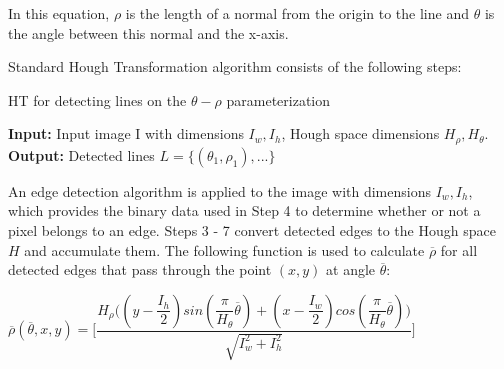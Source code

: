 In this equation, \textit{$ \rho $} is the length of a normal from the origin to the line and \textit{$ \theta $} is the angle between this normal and the x-axis.
 

 
Standard Hough Transformation algorithm consists of the following steps\cite{Standard_Hough}:
 
\begin{algorithm}[h]

 \caption{ HT for detecting lines on the $\theta - \rho$ parameterization}
\begin{algorithmic}[1]
        \newline
        \textbf{Input: }Input image I with dimensions $I_{w},I_{h}$, Hough space dimensions $H_{\rho},H_{\theta}$.\newline
        \textbf{Output:} Detected lines $L=\lbrace(\theta_{1},\rho_{1}),...\rbrace$ 
         \EndIf
         \EndFor
        
        \EndProcedure
 \end{algorithmic}    
 \end{algorithm}
 
 
An edge detection algorithm is applied to the image with dimensions $I_{w}, I_{h}$, which provides the binary data used in Step 4 to determine whether or not a pixel belongs to an edge. Steps 3 - 7 convert detected edges to the Hough space $H$ and accumulate them. The following function is used to calculate $\overline{\rho}$ for all detected edges that pass through the point $(x,y)$ at angle $\overline{\theta}$\cite{Standard_Hough}: 
 
 
 \begin{center}
 
 
$ \overline{\rho}(\overline{\theta},x,y) = \Bigg[\dfrac{H_{\rho}\big((y-\dfrac{I_{h}}{2})sin(\dfrac{\pi}{H_{\theta}}\overline{\theta})+(x-\dfrac{I_{w}}{2})cos(\dfrac{\pi}{H_{\theta}}\overline{\theta})\big)}{\sqrt{I^{2}_{w}+I^{2}_{h}}}\Bigg] $ 
 \end{center}
 
